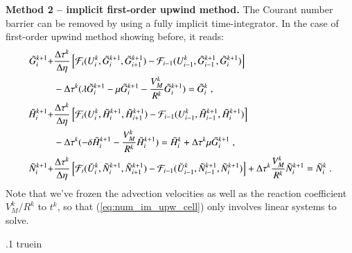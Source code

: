 \documentclass{amsart}
\theoremstyle{definition}
\theoremstyle{remark}
\numberwithin{equation}{section}
\numberwithin{figure}{section}
\begin{document}
\noindent
{\bf Method 2 -- implicit first-order upwind method.}
The Courant number barrier can be removed by using a fully implicit time-integrator. 
In the case of first-order upwind method showing before, it reads:
\begin{subequations}\label{eq:num_im_upw_cell}
\begin{align}
\label{eq:num_im_upw_cell_g}
\tilde{G}_i^{k+1} + &\frac{\Delta\tau^k}{\Delta\eta}\left[\mathcal{F}_i(U_i^k,\tilde{G}_i^{k+1},\tilde{G}_{i+1}^{k+1})-\mathcal{F}_{i-1}(U_{i-1}^k,\tilde{G}_{i-1}^{k+1},\tilde{G}_i^{k+1})\right] \\
\notag
    &- \Delta\tau^k(\lambda\tilde{G}_i^{k+1}-\mu\tilde{G}_i^{k+1}-\frac{V_M^k}{R^k}\tilde{G}_i^{k+1})= \tilde{G}_i^k  \;, \\
\label{eq:num_im_upw_cell_h}
\tilde{H}_i^{k+1} + &\frac{\Delta\tau^k}{\Delta\eta}\left[\mathcal{F}_i(U_i^k,\tilde{H}_i^{k+1},\tilde{H}_{i+1}^{k+1})-\mathcal{F}_{i-1}(U_{i-1}^k,\tilde{H}_{i-1}^{k+1},\tilde{H}_i^{k+1})\right] \\
\notag
    &- \Delta\tau^k(-\delta\tilde{H}_i^{k+1}-\frac{V_M^k}{R^k}\tilde{H}_i^{k+1}) = \tilde{H}_i^k  + \Delta\tau^k\mu\tilde{G}_i^{k+1}\;, \\
\label{eq:num_im_upw_cell_n}
\tilde{N}_i^{k+1} + &\frac{\Delta\tau^k}{\Delta\eta}\left[\mathcal{F}_i(\check{U}_i^k,\tilde{N}_i^{k+1},\tilde{N}_{i+1}^{k+1})-\mathcal{F}_{i-1}(\check{U}_{i-1}^k,\tilde{N}_{i-1}^{k+1},\tilde{N}_i^{k+1})\right] + \Delta\tau^k\frac{V_M^k}{R^k}\tilde{N}_i^{k+1} = \tilde{N}_i^k \;.
\end{align}
\end{subequations}
Note that we've frozen the advection velocities as well as the reaction coefficient $V_M^k/R^k$ to $t^k$, so that (\ref{eq:num_im_upw_cell}) only involves linear systems to solve.

\vglue .1 truein
\end{document}
